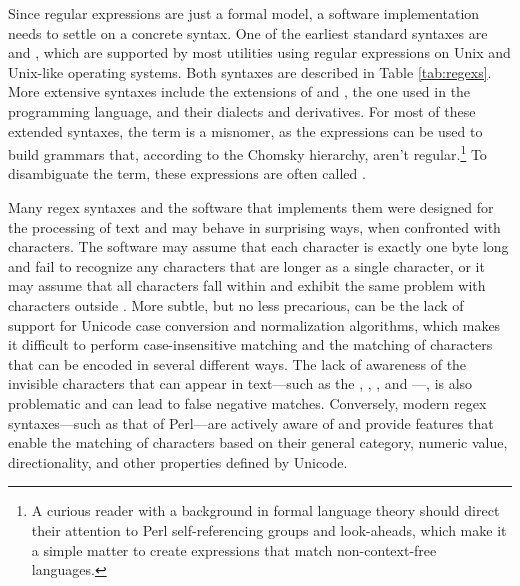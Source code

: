 \documentclass[a5paper,10pt]{book}
\begin{document}
Since regular expressions are just a formal model, a software implementation
needs to settle on a concrete syntax. One of the earliest standard syntaxes are
 and , which are supported by most utilities using
regular expressions on Unix and Unix-like operating systems. Both syntaxes are
described in Table \ref{tab:regexs}. More extensive syntaxes include the
 extensions of  and , the one used
in the  programming language, and their dialects and derivatives. For
most of these extended syntaxes, the term  is a misnomer, as the
expressions can be used to build grammars that, according to the Chomsky
hierarchy, aren't regular.\footnote{
  A curious reader with a background in formal language theory should direct
  their attention to Perl self-referencing groups and look-aheads, which make it
  a simple matter to create expressions that match non-context-free languages.
} To disambiguate the term, these expressions are often called
.


Many regex syntaxes and the software that implements them were designed for the
processing of  text and may behave in surprising ways, when
confronted with  characters. The software may assume that each
character is exactly one byte long and fail to recognize any characters that are
longer as a single character, or it may assume that all  characters
fall within  and exhibit the same problem with characters outside
. More subtle, but no less precarious, can be the lack of support
for Unicode case conversion and normalization algorithms, which makes it
difficult to perform case-insensitive matching and the matching of characters
that can be encoded in several different ways. The lack of awareness of the
invisible characters that can appear in  text---such as the
, , , and ---, is also problematic
and can lead to false negative matches. Conversely, modern regex syntaxes---such
as that of Perl---are actively aware of  and provide features that
enable the matching of characters based on their general category, numeric
value, directionality, and other properties defined by Unicode.
\end{document}
